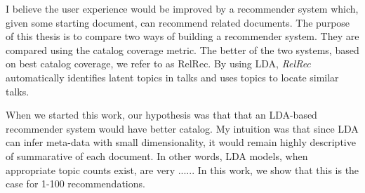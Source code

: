 I believe the user experience would be improved by a recommender system which, given some starting document, can recommend related documents. The purpose of this thesis is to compare two ways of building a recommender system. They are compared using the catalog coverage metric. The better of the two systems, based on best catalog coverage, we refer to as RelRec. By using LDA, \textit{RelRec} automatically identifies latent topics in talks and uses topics to locate similar talks.

When we started this work, our hypothesis was that that an LDA-based recommender system would have better catalog. My intuition was that since LDA can infer meta-data with small dimensionality, it would remain highly descriptive of summarative of each document. In other words, LDA models, when appropriate topic counts exist, are very ...... In this work, we show that this is the case for 1-100 recommendations.
